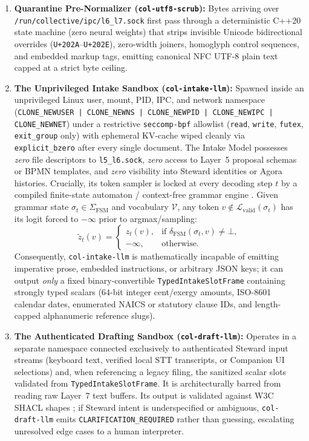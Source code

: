 \begin{enumerate}
  \item \textbf{Quarantine Pre-Normalizer (\texttt{col-utf8-scrub}):} Bytes arriving over \texttt{/run/collective/ipc/l6\_l7.sock} first pass through a deterministic C++20 state machine (zero neural weights) that strips invisible Unicode bidirectional overrides (\texttt{U+202A}--\texttt{U+202E}), zero-width joiners, homoglyph control sequences, and embedded markup tags, emitting canonical NFC UTF-8 plain text capped at a strict byte ceiling.
  \item \textbf{The Unprivileged Intake Sandbox (\texttt{col-intake-llm}):} Spawned inside an unprivileged Linux user, mount, PID, IPC, and network namespace (\texttt{CLONE\_NEWUSER | CLONE\_NEWNS | CLONE\_NEWPID | CLONE\_NEWIPC | CLONE\_NEWNET}) under a restrictive \texttt{seccomp-bpf} allowlist (\texttt{read}, \texttt{write}, \texttt{futex}, \texttt{exit\_group} only) with ephemeral KV-cache wiped cleanly via \texttt{explicit\_bzero} after every single document. The Intake Model possesses \emph{zero} file descriptors to \texttt{l5\_l6.sock}, \emph{zero} access to Layer~5 proposal schemas or BPMN templates, and \emph{zero} visibility into Steward identities or Agora histories. Crucially, its token sampler is locked at every decoding step $t$ by a compiled finite-state automaton / context-free grammar engine \parencite{willard2023outlines}. Given grammar state $\sigma_t \in \Sigma_{\mathrm{FSM}}$ and vocabulary $\mathcal{V}$, any token $v \notin \mathcal{L}_{\mathrm{valid}}(\sigma_t)$ has its logit forced to $-\infty$ prior to argmax/sampling:
  \begin{equation}
  \tilde{z}_t(v) =
  \begin{cases}
  z_t(v), & \text{if } \delta_{\mathrm{FSM}}(\sigma_t, v) \neq \bot, \\
  -\infty, & \text{otherwise.}
  \end{cases}
  \label{eq:fsm-logit-mask}
  \end{equation}
  Consequently, \texttt{col-intake-llm} is mathematically incapable of emitting imperative prose, embedded instructions, or arbitrary JSON keys; it can output \emph{only} a fixed binary-convertible \texttt{TypedIntakeSlotFrame} containing strongly typed scalars (64-bit integer cent/exergy amounts, ISO-8601 calendar dates, enumerated NAICS or statutory clause IDs, and length-capped alphanumeric reference slugs).
  \item \textbf{The Authenticated Drafting Sandbox (\texttt{col-draft-llm}):} Operates in a separate namespace connected exclusively to authenticated Steward input streams (keyboard text, verified local STT transcripts, or Companion UI selections) and, when referencing a legacy filing, the sanitized scalar slots validated from \texttt{TypedIntakeSlotFrame}. It is architecturally barred from reading raw Layer~7 text buffers. Its output is validated against W3C SHACL shapes \parencite{w3c2017shacl}; if Steward intent is underspecified or ambiguous, \texttt{col-draft-llm} emits \texttt{CLARIFICATION\_REQUIRED} rather than guessing, escalating unresolved edge cases to a human interpreter.

\end{enumerate}
